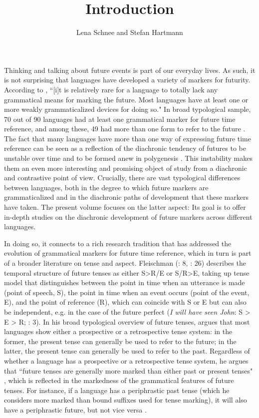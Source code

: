 \documentclass[output=paper,colorlinks,citecolor=brown]{langscibook}
\author{Lena Schnee\orcid{}\affiliation{Universität Hamburg} and
        Stefan Hartmann\orcid{}\affiliation{Heinrich-Heine-Universität Düsseldorf}}
\title{Introduction}
\begin{document}
\maketitle

\noindent Thinking and talking about future events is part of our everyday lives. As such, it is not surprising that languages have developed a variety of markers for futurity. According to \citet{wals-67}, ``[i]t is relatively rare for a language to totally lack any grammatical means for marking the future. Most languages have at least one or more weakly grammaticalized devices for doing so." In  broad typological sample, 70 out of 90 languages had at least one grammatical marker for future time reference, and among these, 49 had more than one form to refer to the future \citep[also see][2]{wiemer_between_2024}. The fact that many languages have more than one way of expressing future time reference can be seen as a reflection of the diachronic tendency of futures to be unstable over time and to be formed anew in polygenesis \citep[][2]{wiemer_between_2024}. This instability makes them an even more interesting and promising object of study from a diachronic and contrastive point of view. Crucially, there are vast typological differences between languages, both in the degree to which future markers are grammaticalized and in the diachronic paths of development that these markers have taken. The present volume focuses on the latter aspect: Its goal is to offer in-depth studies on the diachronic development of future markers across different languages. 

In doing so, it connects to a rich research tradition that has addressed the evolution of grammatical markers for future time reference, which in turn is part of a broader literature on tense and aspect. Fleischman (\citeyear{Fleischman1982}: 8,  \citeyear{fleischman_tense_1990}: 26) describes the temporal structure of future tenses as either S>R/E or S/R>E, taking up  tense model that distinguishes between the point in time when an utterance is made (point of speech, S), the point in time when an event occurs (point of the event, E), and the point of reference (R), which can coincide with S or E but can also be independent, e.g. in the case of the future perfect (\textit{I will have seen John}: S > E > R; \citeauthor{Reichenbach1947} \citeyear{Reichenbach1947}: 3).  In his broad typological overview of future tenses, \citet[]{Ultan1978} argues that most languages show either a prospective or a retrospective tense system: in the former, the present tense can generally be used to refer to the future; in the latter, the present tense can generally be used to refer to the past. Regardless of whether a language has a prospective or a retrospective tense system, he argues that ``future tenses are generally more marked than either past or present tenses" \citep[][116]{Ultan1978}, which is reflected in the markedness of the grammatical features of future tenses. For instance, if a language has a periphrastic past tense (which he considers more marked than bound suffixes used for tense marking), it will also have a periphrastic future, but not vice versa \citep[][90--91]{Ultan1978}.
\end{document}

